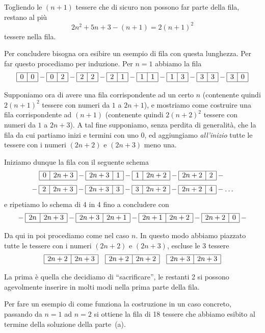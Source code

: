 {Togliendo le $(n+1)$ tessere che di sicuro non possono far parte della fila, restano al più
$$2n^{2}+5n+3-(n+1)=2(n+1)^{2}$$ 
tessere nella fila.

Per concludere bisogna ora esibire un esempio di fila con questa lunghezza. Per far questo procediamo per induzione. Per $n=1$ abbiamo la fila
$$\domino{0}{0}-\domino{0}{2}-\domino{2}{2}-\domino{2}{1}-
\domino{1}{1}-\domino{1}{3}-\domino{3}{3}-\domino{3}{0}$$

Supponiamo ora di avere una fila corrispondente ad un certo $n$ (contenente quindi $2(n+1)^{2}$ tessere con numeri da $1$ a $2n+1$), e mostriamo come costruire una fila corrispondente ad $(n+1)$ (contenente quindi $2(n+2)^{2}$ tessere con numeri da $1$ a $2n+3$). A tal fine supponiamo, senza perdita di generalità, che la fila da cui partiamo inizi e termini con uno 0, ed aggiungiamo \emph{all'inizio} tutte le tessere con i numeri $(2n+2)$ e $(2n+3)$ meno una.

Iniziamo dunque la fila con il seguente schema
$$\domino{0}{2n+3}-\domino{2n+3}{1}-\domino{1}{2n+2}-\domino{2n+2}{2}-\mbox{}$$
$$\mbox{}-\domino{2}{2n+3}-\domino{2n+3}{3}-
\domino{3}{2n+2}-\domino{2n+2}{4}-\mbox{\ldots}$$
e ripetiamo lo schema di 4 in 4 fino a concludere con
$$\mbox{}-\domino{2n}{2n+3}-\domino{2n+3}{2n+1}-
\domino{2n+1}{2n+2}-\domino{2n+2}{0}-\mbox{}$$

Da qui in poi procediamo come nel caso $n$. In questo modo abbiamo piazzato tutte le tessere con i numeri $(2n+2)$ e $(2n+3)$, escluse le 3 tessere
$$\domino{2n+2}{2n+3}\quad\domino{2n+2}{2n+2}\quad\domino{2n+3}{2n+3}$$

La prima è quella che decidiamo di ``sacrificare'', le restanti 2 si possono agevolmente inserire in molti modi nella prima parte della fila.

Per fare un esempio di come funziona la costruzione in un caso concreto, passando da $n=1$ ad $n=2$ si ottiene la fila di 18 tessere che abbiamo esibito al termine della soluzione della parte~(a).
}

